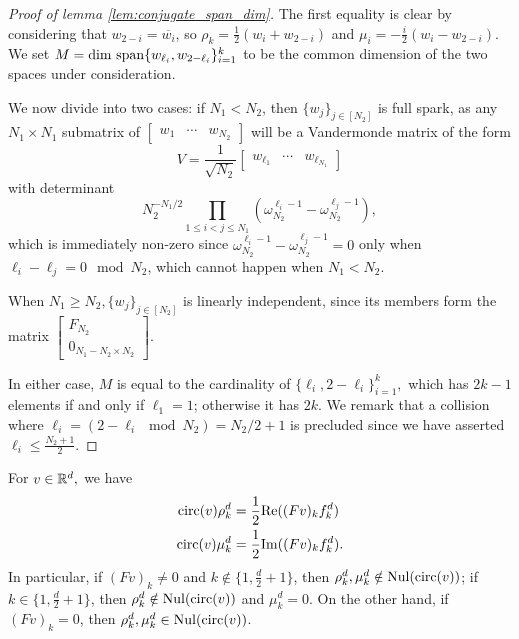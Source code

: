 \begin{proof}[Proof of lemma \ref{lem:conjugate_span_dim}]

The first equality is clear by considering that $w_{2 - i} = \overline{w_i}$, so $\rho_k = \frac{1}{2}(w_i + w_{2-i})$ and $\mu_i = -\frac{i}{2}(w_i - w_{2 - i})$.  We set $M = \dim\,\operatorname{span}\{w_{\ell_i}, w_{2 - \ell_i}\}_{i = 1}^k$ to be the common dimension of the two spaces under consideration.

We now divide into two cases: if $N_1 < N_2$, then $\{w_j\}_{j \in [N_2]}$ is full spark, as any $N_1 \times N_1$ submatrix of $\begin{bmatrix} w_1 & \cdots & w_{N_2} \end{bmatrix}$ will be a Vandermonde matrix of the form \[V = \frac{1}{\sqrt{N_2}}\begin{bmatrix} w_{\ell_1} & \cdots & w_{\ell_{N_1}} \end{bmatrix}\] with determinant \[N_2^{-N_1 / 2}\prod_{1 \le i < j \le N_1} (\omega_{N_2}^{\ell_i - 1} - \omega_{N_2}^{\ell_j - 1}),\] which is immediately non-zero since $\omega_{N_2}^{\ell_i - 1} - \omega_{N_2}^{\ell_j - 1} = 0$ only when $\ell_i - \ell_j = 0 \mod N_2$, which cannot happen when $N_1 < N_2$.

When $N_1 \ge N_2, \{w_j\}_{j \in [N_2]}$ is linearly independent, since its members form the matrix $\begin{bmatrix} F_{N_2} \\ 0_{N_1 - N_2 \times N_2} \end{bmatrix}$.

In either case, $M$ is equal to the cardinality of $\{\ell_i, 2 - \ell_i\}_{i = 1}^k,$ which has $2k - 1$ elements if and only if $\ell_1 = 1$; otherwise it has $2k$.  We remark that a collision where $\ell_i = (2 - \ell_i \mod N_2) = N_2 / 2 + 1$ is precluded since we have asserted $\ell_i \le \frac{N_2 + 1}{2}$.

\end{proof}

\begin{lemma}
  For $v \in \mathbb{R}^d,$ we have \begin{align} \operatorname{circ}(v) \rho_k^d &= \frac{1}{2}\mathrm{Re}((Fv)_k f_k^d) \label{eq:real_part} \\ \operatorname{circ}(v) \mu_k^d &= \frac{1}{2}\mathrm{Im}((Fv)_k f_k^d) \label{eq:imag_part}. \end{align} In particular, if $(Fv)_k \neq 0$ and $k \notin \{1, \frac{d}{2} + 1\}$, then $\rho_k^d, \mu_k^d \notin \operatorname{Nul}(\operatorname{circ}(v))$; if $k \in \{1, \frac{d}{2} + 1\}$, then $\rho_k^d \notin \operatorname{Nul}(\operatorname{circ}(v))$ and $\mu_k^d = 0$.  On the other hand, if $(Fv)_k = 0$, then $\rho_k^d, \mu_k^d \in \operatorname{Nul}(\operatorname{circ}(v))$.  \label{lem:eigenbits}
\end{lemma}

